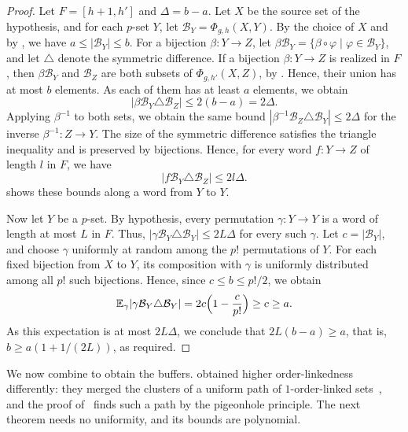 \documentclass[fontsize=12pt,leading=14pt]{fullpaper}
\newcommand{\Bcal}{\mathcal{B}}
\begin{document}
\begin{proof}
  Let $F=[h+1,h']$ and $\Delta=b-a$.
  Let $X$ be the source set of the hypothesis, and for each $p$-set $Y$, let $\Bcal_Y=\Phi_{g,h}(X,Y)$.
  By the choice of $X$ and by , we have $a\le|\Bcal_Y|\le b$.
  For a bijection $\beta\colon Y\to Z$, let $\beta\Bcal_Y=\{\beta\circ\varphi\mid\varphi\in\Bcal_Y\}$, and let $\triangle$ denote the symmetric difference.
  If a bijection $\beta\colon Y\to Z$ is realized in $F$, then $\beta\Bcal_Y$ and $\Bcal_Z$ are both subsets of $\Phi_{g,h'}(X,Z)$, by .
  Hence, their union has at most $b$ elements.
  As each of them has at least $a$ elements, we obtain
  \[
    |\beta\Bcal_Y\triangle\Bcal_Z|\le2(b-a)=2\Delta.
  \]
  Applying $\beta^{-1}$ to both sets, we obtain the same bound $|\beta^{-1}\Bcal_Z\triangle\Bcal_Y|\le2\Delta$ for the inverse $\beta^{-1}\colon Z\to Y$.
  The size of the symmetric difference satisfies the triangle inequality and is preserved by bijections.
  Hence, for every word $f\colon Y\to Z$ of length $l$ in $F$, we have
  \[
    |f\Bcal_Y\triangle\Bcal_Z|\le2l\Delta.
  \]
   shows these bounds along a word from $Y$ to $Y$.

  Now let $Y$ be a $p$-set.
  By hypothesis, every permutation $\gamma\colon Y\to Y$ is a word of length at most $L$ in $F$.
  Thus, $|\gamma\Bcal_Y\triangle\Bcal_Y|\le2L\Delta$ for every such $\gamma$.
  Let $c=|\Bcal_Y|$, and choose $\gamma$ uniformly at random among the $p!$ permutations of $Y$.
  For each fixed bijection from $X$ to $Y$, its composition with $\gamma$ is uniformly distributed among all $p!$ such bijections.
  Hence, since $c\le b\le p!/2$, we obtain
  \[
    \mathbb E_\gamma|\gamma\Bcal_Y\triangle\Bcal_Y|
    =2c\Bigl(1-\frac{c}{p!}\Bigr)\ge c\ge a.
  \]
  As this expectation is at most $2L\Delta$, we conclude that $2L(b-a)\ge a$, that is, $b\ge a(1+1/(2L))$, as required.
\end{proof}

We now combine  to obtain the buffers.
\textcite{HKMM26a} obtained higher order-linkedness differently: they merged the clusters of a uniform path of $1$-order-linked sets~\cite[Lemma~7.7 and Theorem~7.8]{HKMM26a}, and the proof of~\cite[Lemma~9.2]{HKMM26a} finds such a path by the pigeonhole principle.
The next theorem needs no uniformity, and its bounds are polynomial.
\end{document}
